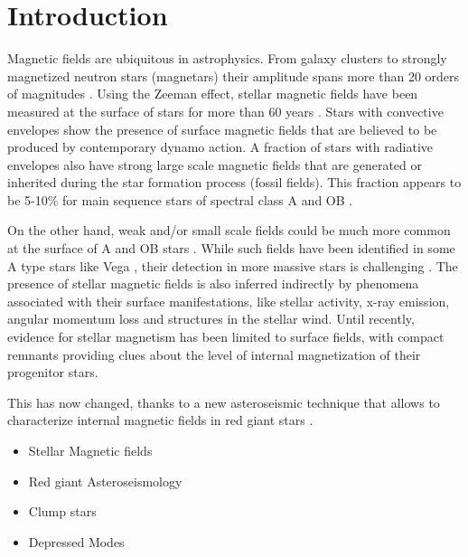 \section{Introduction}
\label{intro}
Magnetic fields are ubiquitous in astrophysics. From  galaxy clusters to strongly magnetized neutron stars (magnetars) their amplitude spans more than 20 orders of magnitudes \citep{Brandenburg_2005}. Using the Zeeman effect, stellar magnetic fields have been measured at the surface of stars
for more than 60 years \citep{Babcock_1947,Landstreet_1992,Donati_2009}. Stars with convective envelopes show the presence of surface magnetic fields that are believed to be produced by contemporary dynamo action. A fraction of stars with radiative envelopes also have strong large scale magnetic fields that are generated or inherited during the star formation process (fossil fields). This fraction appears to be 5-10\% for main sequence stars of spectral class A \citep[e.g.,][]{Auri_re_2004} and OB \citep{2012ASPC..464..405W}.

On the other hand, weak and/or small scale fields could be much more common at the surface of A and OB stars \citep{Cantiello_2011}. While such fields have been identified in some A type stars like Vega \cite{Ligni_res_2009}, their detection in more massive stars is challenging \cite{2013A&A...554A..93K}. The presence of stellar magnetic fields is also inferred indirectly by phenomena associated with their surface manifestations, like stellar activity, x-ray emission, angular momentum loss and structures in the stellar wind. Until recently, evidence for stellar magnetism has been limited to surface fields, with compact remnants providing clues about the level of internal magnetization of their progenitor stars.

This has now changed, thanks to a new asteroseismic technique that allows to characterize internal magnetic fields in red giant stars \cite{Fuller_2015}. 
\begin{itemize}
\item Stellar Magnetic fields
\item Red giant Asteroseismology
\item Clump stars
\item Depressed Modes
\end{itemize}


  